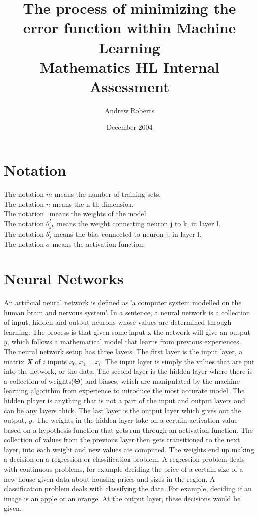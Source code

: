 \documentclass[a4paper,12pt]{article}
\begin{document}
\title{%
  The process of minimizing the error function within Machine Learning \\
  \small Mathematics HL Internal Assessment}
\author{Andrew Roberts}
\date{December 2004}
\maketitle
\pagebreak

\section{Notation}
The notation \(m\) means the number of training sets. \\
The notation \(n\) means the n-th dimension.  \\
The notation \boldmath{$\Theta$}\unboldmath \ means the weights of the model. \\
The notation $\theta_{jk}^l$ means the weight connecting neuron j to k, in layer l. \\
The notation $b_j^l$ means the bias connected to neuron j, in layer l. \\
The notation $\sigma$ means the activation function.

\section{Neural Networks}
An artificial neural network is defined as 'a computer system modelled on the human brain and nervous system'. In a sentence, a neural network is a collection of input, hidden and output neurons whose values are determined through learning. The process is that given some input x the network will give an output \(y\), which follows a mathematical model that learns from previous experiences. The neural network setup has three layers. The first layer is the input layer, a matrix \textbf{\emph{X}} of \(i\) inputs \(x_0,x_1,...x_i\). The input layer is simply the values that are put into the network, or the data. The second layer is the hidden layer where there is a collection of weights(\(\boldsymbol{\Theta}\)) and biases, which are manipulated by the machine learning algorithm from experience to introduce the most accurate model. The hidden player is anything that is not a part of the input and output layers and can be any layers thick. The last layer is the output layer which gives out the output, \(y\). The weights in the hidden layer take on a certain activation value based on a hypothesis function that gets run through an activation function. The collection of values from the previous layer then gets transitioned to the next layer, into each weight and new values are computed. The weights end up making a decision on a regression or classification problem. A regression problem deals with continuous problems, for example deciding the price of a certain size of a new house given data about housing prices and sizes in the region. A classification problem deals with classifying the data. For example, deciding if an image is an apple or an orange. At the output layer, these decisions would be given.
\end{document}
